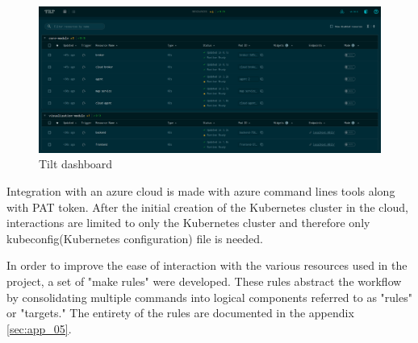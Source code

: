 \begin{figure}[H]
    \centering
    \includegraphics[width=\textwidth]{pictures/tilt.png}
    \caption{ Tilt dashboard}
    \label{fig:tilt}
\end{figure}

Integration with an azure cloud is made with azure command lines tools along with PAT token. After the initial creation of the Kubernetes cluster in the cloud, interactions are limited to only the Kubernetes cluster and therefore only kubeconfig(Kubernetes configuration) file is needed.

In order to improve the ease of interaction with the various resources used in the project, a set of "make rules" were developed. These rules abstract the workflow by consolidating multiple commands into logical components referred to as "rules" or "targets." The entirety of the rules are documented in the appendix \ref{sec:app_05}.
